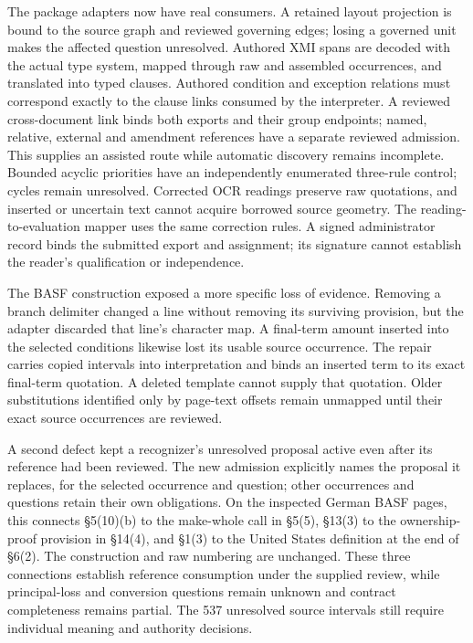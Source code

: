 The package adapters now have real consumers.  A retained layout projection is
bound to the source graph and reviewed governing edges; losing a governed unit
makes the affected question unresolved.  Authored XMI spans are decoded with
the actual type system, mapped through raw and assembled occurrences, and
translated into typed clauses.  Authored condition and exception relations
must correspond exactly to the clause links consumed by the interpreter.  A
reviewed cross-document link binds both exports and their group endpoints;
named, relative, external and amendment references have a separate reviewed
admission.  This supplies an assisted route while automatic discovery remains
incomplete.  Bounded acyclic priorities have an independently enumerated
three-rule control; cycles remain unresolved.  Corrected OCR readings preserve
raw quotations, and inserted or uncertain text cannot acquire borrowed source
geometry.  The reading-to-evaluation mapper uses the same correction rules.
A signed administrator record binds the submitted export and assignment; its
signature cannot establish the reader's qualification or independence.

The BASF construction exposed a more specific loss of evidence.  Removing a
branch delimiter changed a line without removing its surviving provision, but
the adapter discarded that line's character map.  A final-term amount inserted
into the selected conditions likewise lost its usable source occurrence.  The
repair carries copied intervals into interpretation and binds an inserted term
to its exact final-term quotation.  A deleted template cannot supply that
quotation.  Older substitutions identified only by page-text offsets remain
unmapped until their exact source occurrences are reviewed.

A second defect kept a recognizer's unresolved proposal active even after its
reference had been reviewed.  The new admission explicitly names the proposal
it replaces, for the selected occurrence and question; other occurrences and
questions retain their own obligations.  On the inspected German BASF pages,
this connects \S5(10)(b) to the make-whole call in \S5(5), \S13(3) to the
ownership-proof provision in \S14(4), and \S1(3) to the United States definition
at the end of \S6(2).  The construction and raw numbering are unchanged.
These three connections establish reference consumption under the supplied
review, while principal-loss and conversion questions remain unknown and
contract completeness remains partial.  The 537 unresolved source intervals
still require individual meaning and authority decisions.

